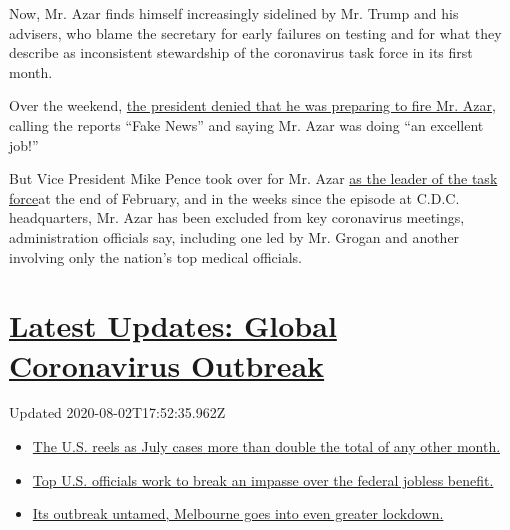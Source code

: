 Now, Mr. Azar finds himself increasingly sidelined by Mr. Trump and his
advisers, who blame the secretary for early failures on testing and for
what they describe as inconsistent stewardship of the coronavirus task
force in its first month.

Over the weekend,
\href{https://twitter.com/realDonaldTrump/status/1254529069733105665}{the
president denied that he was preparing to fire Mr. Azar}, calling the
reports ``Fake News'' and saying Mr. Azar was doing ``an excellent
job!''

But Vice President Mike Pence took over for Mr. Azar
\href{https://www.nytimes.com/2020/02/26/us/politics/trump-coronavirus-cdc.html}{as
the leader of the task force}at the end of February, and in the weeks
since the episode at C.D.C. headquarters, Mr. Azar has been excluded
from key coronavirus meetings, administration officials say, including
one led by Mr. Grogan and another involving only the nation's top
medical officials.

\hypertarget{latest-updates-global-coronavirus-outbreak}{%
\section{\texorpdfstring{\href{https://www.nytimes.com/2020/08/01/world/coronavirus-covid-19.html?action=click\&pgtype=Article\&state=default\&region=MAIN_CONTENT_1\&context=storylines_live_updates}{Latest
Updates: Global Coronavirus
Outbreak}}{Latest Updates: Global Coronavirus Outbreak}}\label{latest-updates-global-coronavirus-outbreak}}

Updated 2020-08-02T17:52:35.962Z

\begin{itemize}
\tightlist
\item
  \href{https://www.nytimes.com/2020/08/01/world/coronavirus-covid-19.html?action=click\&pgtype=Article\&state=default\&region=MAIN_CONTENT_1\&context=storylines_live_updates\#link-34047410}{The
  U.S. reels as July cases more than double the total of any other
  month.}
\item
  \href{https://www.nytimes.com/2020/08/01/world/coronavirus-covid-19.html?action=click\&pgtype=Article\&state=default\&region=MAIN_CONTENT_1\&context=storylines_live_updates\#link-780ec966}{Top
  U.S. officials work to break an impasse over the federal jobless
  benefit.}
\item
  \href{https://www.nytimes.com/2020/08/01/world/coronavirus-covid-19.html?action=click\&pgtype=Article\&state=default\&region=MAIN_CONTENT_1\&context=storylines_live_updates\#link-2bc8948}{Its
  outbreak untamed, Melbourne goes into even greater lockdown.}
\end{itemize}


